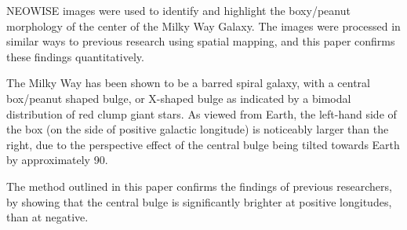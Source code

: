 \documentclass[]{letter}
\begin{document}
\begin{letter}
NEOWISE images were used to identify and highlight the boxy/peanut morphology of the center of the Milky Way Galaxy. The images were processed in similar ways to previous research using spatial mapping, and this paper confirms these findings quantitatively.

The Milky Way has been shown to be a barred spiral galaxy, with a central box/peanut shaped bulge, or X-shaped bulge as indicated by a bimodal distribution of red clump giant stars. As viewed from Earth, the left-hand side of the box (on the side of positive galactic longitude) is noticeably larger than the right, due to the perspective effect of the central bulge being tilted towards Earth by approximately 90{\circ}.

The method outlined in this paper confirms the findings of previous researchers, by showing that the central bulge is significantly brighter at positive longitudes, than at negative. 


\end{letter}
\end{document}
